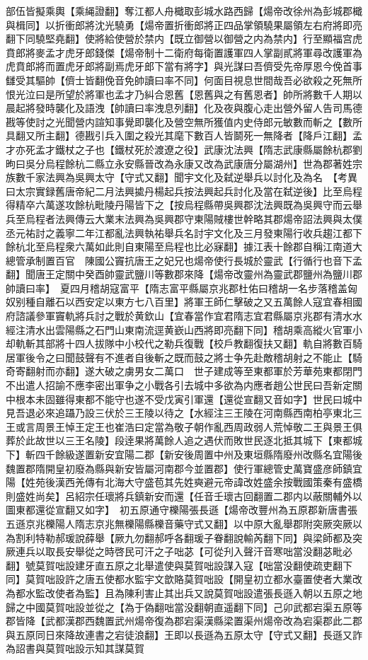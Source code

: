 部伍皆擬乘輿【乘䋲證翻】奪江都人舟檝取彭城水路西歸【煬帝改徐州為彭城郡檝與楫同】以折衝郎將沈光驍勇【煬帝置折衝郎將正四品掌領驍果屬領左右府將即亮翻下同驍堅堯翻】使將給使營於禁内【既立御營以御營之内為禁内】行至顯福宫虎賁郎將麥孟才虎牙郎錢傑【煬帝制十二衛府每衛置護軍四人掌副貳將軍尋改護軍為虎賁郎將而置虎牙郎將副焉虎牙郎下當有將字】與光謀曰吾儕受先帝厚恩今俛首事讎受其驅帥【儕士皆翻俛音免帥讀曰率不同】何面目視息世間哉吾必欲殺之死無所恨光泣曰是所望於將軍也孟才乃糾合恩舊【恩舊與之有舊恩者】帥所將數千人期以晨起將發時襲化及語洩【帥讀曰率洩息列翻】化及夜與腹心走出營外留人告司馬德戡等使討之光聞營内諠知事覺即襲化及營空無所獲值内史侍郎元敏數而斬之【數所具翻又所主翻】德戡引兵入圍之殺光其麾下數百人皆鬬死一無降者【降戶江翻】孟才亦死孟才鐵杖之子也【鐵杖死於渡遼之役】武康沈法興【隋志武康縣屬餘杭郡劉昫曰吳分烏程餘杭二縣立永安縣晉改為永康又改為武康唐分屬湖州】世為郡著姓宗族數千家法興為吳興太守【守式又翻】聞宇文化及弑逆舉兵以討化及為名　【考異曰太宗實録舊唐帝紀二月法興㨿丹楊起兵按法興起兵討化及當在弑逆後】比至烏程得精卒六萬遂攻餘杭毗陵丹陽皆下之【按烏程縣帶吳興郡沈法興既為吳興守而云舉兵至烏程者法興傳云大業末法興為吳興郡守東陽賊樓世幹略其郡煬帝詔法興與太僕丞元祐討之義寧二年江都亂法興執祐舉兵名討宇文化及三月發東陽行收兵趨江都下餘杭北至烏程衆六萬如此則自東陽至烏程也比必寐翻】據江表十餘郡自稱江南道大總管承制置百官　陳國公竇抗唐王之妃兄也煬帝使行長城於靈武【行循行也音下孟翻】聞唐王定關中癸酉帥靈武鹽川等數郡來降【煬帝改靈州為靈武郡鹽州為鹽川郡帥讀曰率】　夏四月稽胡寇富平【隋志富平縣屬京兆郡杜佑曰稽胡一名步落稽盖匈奴别種自離石以西安定以東方七八百里】將軍王師仁擊破之又五萬餘人寇宜春相國府諮議參軍竇軌將兵討之戰於黄欽山【宜春當作宜君隋志宜君縣屬京兆郡有清水水經注清水出雲陽縣之石門山東南流逕黄嶔山西將即亮翻下同】稽胡乘高縱火官軍小却軌斬其部將十四人拔隊中小校代之勒兵復戰【校戶教翻復扶又翻】軌自將數百騎居軍後令之曰聞鼓聲有不進者自後斬之既而鼓之將士争先赴敵稽胡射之不能止【騎奇寄翻射而亦翻】遂大破之虜男女二萬口　世子建成等至東都軍於芳華苑東都閉門不出遣人招諭不應李密出軍争之小戰各引去城中多欲為内應者趙公世民曰吾新定關中根本未固雖得東都不能守也遂不受戊寅引軍還【還從宣翻又音如字】世民曰城中見吾退必來追躡乃設三伏於三王陵以待之【水經注三王陵在河南縣西南柏亭東北三王或言周景王悼王定王也崔浩曰定當為敬子朝作亂西周政弱人荒悼敬二王與景王俱葬於此故世以三王名陵】段逹果將萬餘人追之遇伏而敗世民逐北抵其城下【東都城下】斬四千餘級遂置新安宜陽二郡【新安後周置中州及東垣縣隋廢州改縣名宜陽後魏置郡隋開皇初廢為縣與新安皆屬河南郡今並置郡】使行軍總管史萬寶盛彦師鎮宜陽【姓苑後漢西羌傳有北海大守盛苞其先姓奭避元帝諱改姓盛余按戰國策秦有盛橋則盛姓尚矣】呂紹宗任瓌將兵鎮新安而還【任音壬瓌古回翻置二郡内以蔽關輔外以圖東都還從宣翻又如字】　初五原通守櫟陽張長遜【煬帝改豐州為五原郡新唐書張五遜京兆櫟陽人隋志京兆無櫟陽縣櫟音藥守式又翻】以中原大亂舉郡附突厥突厥以為割利特勒郝瑗說薛舉【厥九勿翻郝呼各翻瑗子眷翻說輸芮翻下同】與梁師都及突厥連兵以取長安舉從之時啓民可汗之子咄苾【可從刋入聲汗音寒咄當没翻苾毗必翻】號莫賀咄設建牙直五原之北舉遣使與莫賀咄設謀入寇【咄當没翻使疏吏翻下同】莫賀咄設許之唐五使都水監宇文歆賂莫賀咄設【開皇初立都水臺置使者大業改為都水監改使者為監】且為陳利害止其出兵又說莫賀咄設遣張長遜入朝以五原之地歸之中國莫賀咄設並從之【為于偽翻咄當没翻朝直遥翻下同】己卯武都宕渠五原等郡皆降【武都漢郡西魏置武州煬帝復為郡宕渠漢縣梁置渠州煬帝改為宕渠郡此二郡與五原同日來降故連書之宕徒浪翻】王即以長遜為五原太守【守式又翻】長遜又詐為詔書與莫賀咄設示知其謀莫賀
